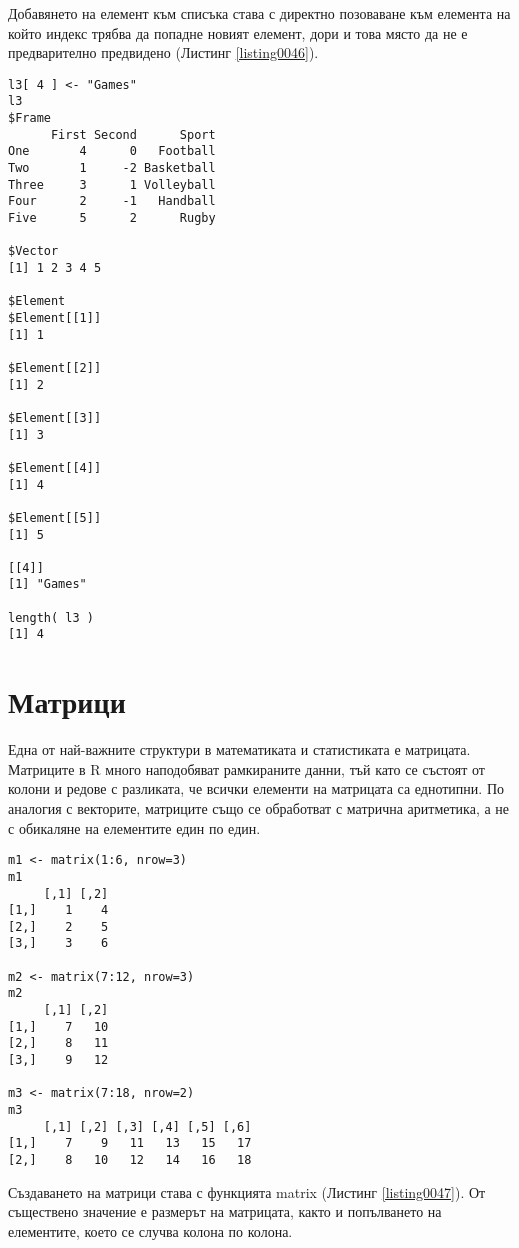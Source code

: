 Добавянето на елемент към списъка става с директно позоваване към елемента на който индекс трябва да попадне новият елемент, дори и това място да не е предварително предвидено (Листинг \ref{listing0046}).

\begin{lstlisting}[caption=Добавяне на елемент, label=listing0046]
l3[ 4 ] <- "Games"
l3
$Frame
      First Second      Sport
One       4      0   Football
Two       1     -2 Basketball
Three     3      1 Volleyball
Four      2     -1   Handball
Five      5      2      Rugby

$Vector
[1] 1 2 3 4 5

$Element
$Element[[1]]
[1] 1

$Element[[2]]
[1] 2

$Element[[3]]
[1] 3

$Element[[4]]
[1] 4

$Element[[5]]
[1] 5

[[4]]
[1] "Games"

length( l3 )
[1] 4
\end{lstlisting}

\section{Матрици}

Една от най-важните структури в математиката и статистиката е матрицата. Матриците в R много наподобяват рамкираните данни, тъй като се състоят от колони и редове с разликата, че всички елементи на матрицата са еднотипни. По аналогия с векторите, матриците също се обработват с матрична аритметика, а не с обикаляне на елементите един по един.

\begin{lstlisting}[caption=Създаване на матрици, label=listing0047]
m1 <- matrix(1:6, nrow=3)
m1
     [,1] [,2]
[1,]    1    4
[2,]    2    5
[3,]    3    6

m2 <- matrix(7:12, nrow=3)
m2
     [,1] [,2]
[1,]    7   10
[2,]    8   11
[3,]    9   12

m3 <- matrix(7:18, nrow=2)
m3
     [,1] [,2] [,3] [,4] [,5] [,6]
[1,]    7    9   11   13   15   17
[2,]    8   10   12   14   16   18
\end{lstlisting}

Създаването на матрици става с функцията matrix (Листинг \ref{listing0047}). От съществено значение е размерът на матрицата, както и попълването на елементите, което се случва колона по колона.


